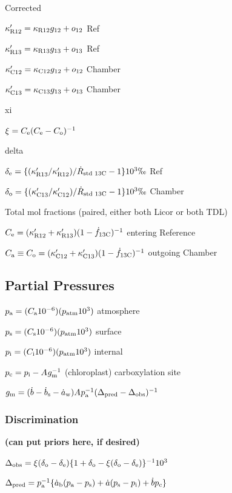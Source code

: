 \noindent
Corrected

$\skappaRtwp = \skappaRtw\sgtw + \sotw$ Ref

$\skappaRthp = \skappaRth\sgth + \soth$ Ref

$\skappaCtwp = \skappaCtw\sgtw + \sotw$ Chamber

$\skappaCthp = \skappaCth\sgth + \soth$ Chamber

\noindent
xi

$\sxi=\sCe(\sCe-\sCo)^{-1}$

\noindent
delta

$\sdeltae = \{ (\skappaRthp/\skappaRtwp)/\sdotRstd - 1 \} 10^3\permil$ Ref

$\sdeltao = \{ (\skappaCthp/\skappaCtwp)/\sdotRstd - 1 \} 10^3\permil$ Chamber

\noindent
Total mol fractions (paired, either both Licor or both TDL)

$\sCe = (\skappaRtwp+\skappaRthp)(1-\sdotfthC)^{-1}$ entering Reference

$\sCa \equiv \sCo = (\skappaCtwp+\skappaCthp)(1-\sdotfthC)^{-1}$ outgoing Chamber









\subsection{Partial Pressures}

$\spa = (\sCa 10^{-6})(\spatmL 10^3)$ atmosphere

$\sps = (\sCs 10^{-6})(\spatmL 10^3)$ surface

$\spi = (\sCi 10^{-6})(\spatmL 10^3)$ internal

$\spc = \spi - \sAL \sgm^{-1}$ (chloroplast) carboxylation site

$\sgm = (\sdotb - \sdotbs - \sdotaw)\sAL\spa^{-1}(\sDeltapred-\sDeltaobs)^{-1}$




\subsubsection{Discrimination}

{\bf (can put priors here, if desired)}

$\sDeltaobs = \sxi(\sdeltao-\sdeltae)\{1+\sdeltao-\sxi(\sdeltao-\sdeltae)\}^{-1}10^3$

$\sDeltapred = \spa^{-1} \{ \sdotab(\spa-\sps) + \sdota(\sps-\spi) + \sdotb\spc \}$


